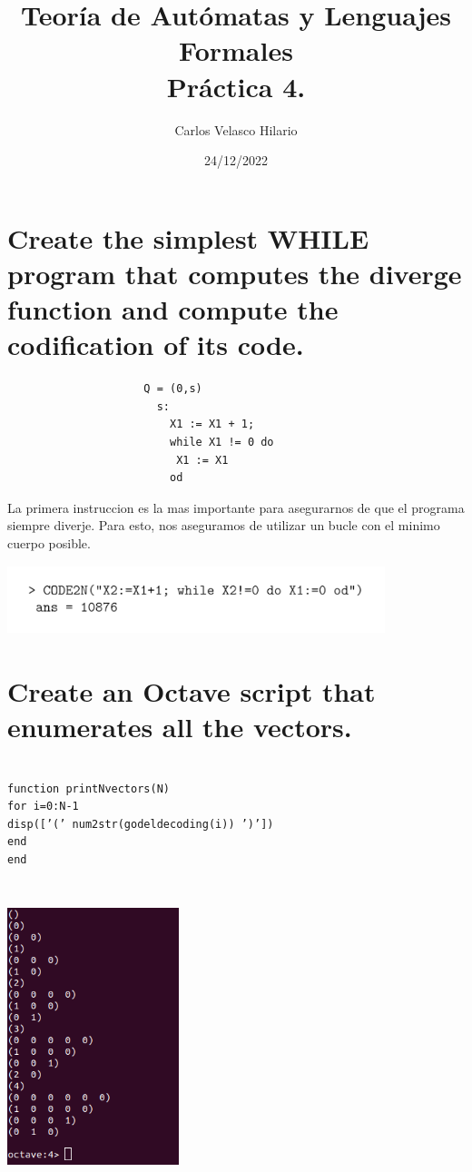 \documentclass[fleqn, 10pt]{article}
\title{Teoría de Autómatas y Lenguajes Formales\\[.4\baselineskip]Práctica 4.}
\author{Carlos Velasco Hilario}
\date{24/12/2022}
\theoremstyle{plain}
\theoremstyle{definition}
\begin{document}
\maketitle

\section{Create the simplest WHILE program that computes the diverge function and compute the codification of its code. }

\begin{verbatim}
                     Q = (0,s)
                       s:
                         X1 := X1 + 1;
                         while X1 != 0 do
                          X1 := X1
                         od
\end{verbatim}
La primera instruccion es la mas importante para asegurarnos de que el programa siempre diverje. Para esto, nos aseguramos de utilizar un bucle con el minimo cuerpo posible.


\begin{center}
\includegraphics[width=11cm, height=2cm]{codigoej1p4.png}
\end{center}
\newpage

\section {Create an Octave script that enumerates all the vectors.}
\begin{verbatim}

function printNvectors(N)
for i=0:N-1
disp([’(’ num2str(godeldecoding(i)) ’)’])
end
end


\end{verbatim}
\begin{center}
\includegraphics[width=5cm, height=8cm]{ejercicio2p4.png}
\end{center}
\end{document}
